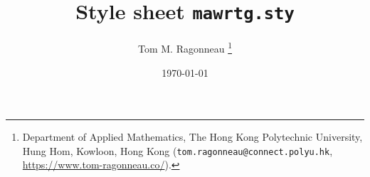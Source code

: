 \documentclass[a4paper]{article}
\title{Style sheet \texttt{mawrtg.sty}}
\author{Tom M. Ragonneau%
    \thanks{%
        Department of Applied Mathematics,
        The Hong Kong Polytechnic University,
        Hung Hom, Kowloon, Hong Kong
        (\texttt{tom.ragonneau@connect.polyu.hk},
        \url{https://www.tom-ragonneau.co/}).
    }
}
\date{\today}
\begin{document}
\maketitle

\nocite{*}
\printbibliography
\end{document}
